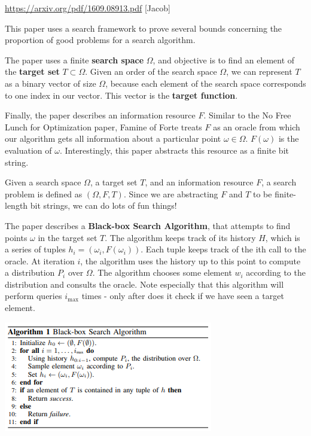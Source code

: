 \documentclass[12pt]{article}
\begin{document}
\url{https://arxiv.org/pdf/1609.08913.pdf} [Jacob]

This paper uses a search framework to prove several bounds concerning the proportion of good problems for a search algorithm. 

The paper uses a finite \textbf{search space} $\Omega$, and objective is to find an element of the \textbf{target set} $T \subset \Omega$. Given an order of the search space $\Omega$, we can represent $T$ as a binary vector of size $\Omega$, because each element of the search space corresponds to one index in our vector. This vector is the \textbf{target function}. 

Finally, the paper describes an information resource $F$. Similar to the No Free Lunch for Optimization paper, Famine of Forte treats $F$ as an oracle from which our algorithm gets all information about a particular point $\omega \in \Omega$. $F(\omega)$ is the evaluation of $\omega$. Interestingly, this paper abstracts this resource as a finite bit string. 

Given a search space $\Omega$, a target set $T$, and an information resource $F$, a search problem is defined as $(\Omega, F, T)$. Since we are abstracting $F$ and $T$ to be finite-length bit strings, we can do lots of fun things!

The paper describes a \textbf{Black-box Search Algorithm}, that attempts to find points $\omega$ in the target set $T$. The algorithm keeps track of its history $H$, which is a series of tuples $h_i = (\omega_i, F(\omega_i))$. Each tuple keeps track of the ith call to the oracle. At iteration $i$, the algorithm uses the history up to this point to compute a distribution $P_i$ over $\Omega$. The algorithm chooses some element $w_i$ according to the distribution and consults the oracle. Note especially that this algorithm will perform queries $i_{\text{max}}$ times - only after does it check if we have seen a target element.

\begin{center}
    \includegraphics{FamineForte/BlackBoxAlgo.PNG}
\end{center}
\end{document}
